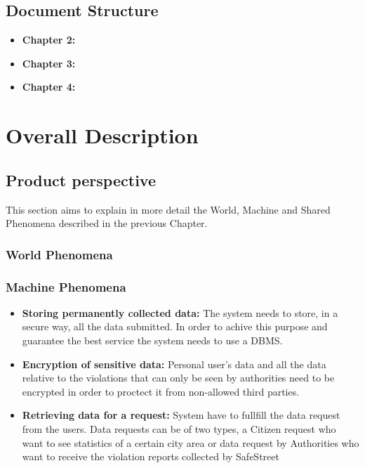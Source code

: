 \documentclass{article}
\begin{document}
\subsection{Document Structure}
\begin{itemize}
    \item \textbf{Chapter 2:}
    \item \textbf{Chapter 3:}
    \item \textbf{Chapter 4:}  
\end{itemize}

\section{Overall Description}

\subsection{Product perspective}
This section aims to explain in more detail the World, Machine and Shared Phenomena described in the 
previous Chapter. 
\subsubsection{World Phenomena}
\subsubsection{Machine Phenomena}
\begin{itemize}
    
\item \textbf{Storing permanently collected data:}
The system needs to store, in a secure way, all the data submitted.
In order to achive this purpose and guarantee the best service
the system needs to use a DBMS.

\item \textbf{Encryption of sensitive data:}
Personal user's data and all the data relative to the violations
that can only be seen by authorities need to be encrypted in order
to proctect it from non-allowed third parties. 

\item \textbf{Retrieving data for a request:}
System have to fullfill the data request from the users. Data 
requests can be of two types, a Citizen request who want to see
statistics of a certain city area or data request by Authorities
who want to receive the violation reports collected by SafeStreet
\end{itemize}
\end{document}
